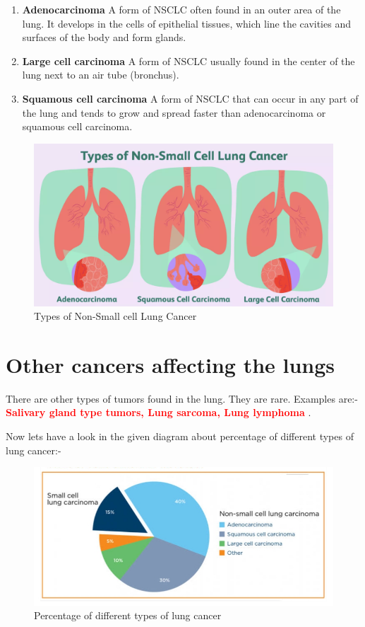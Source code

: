 \begin{enumerate}
    \item \textbf{Adenocarcinoma} A form of NSCLC often found in an outer area of the lung. It develops in the cells of epithelial tissues, which line the cavities and surfaces of the body and form glands.

    \item \textbf{Large cell carcinoma} A form of NSCLC usually found in the center of the lung next to an air tube (bronchus).

    \item \textbf{Squamous cell carcinoma} A form of NSCLC that can occur in any part of the lung and tends to grow and spread faster than adenocarcinoma or squamous cell carcinoma.
\end{enumerate}



\begin{figure}[ht!]
    \centering
    \includegraphics[width= 0.8\linewidth]{images/Non_small_cell_lung_cancer.png}
    \caption{Types of Non-Small cell Lung Cancer}
\end{figure}

\section{Other cancers affecting the lungs} 
There are other types of tumors found in the lung. They are rare. Examples are:- \textcolor{red}{\textbf{Salivary gland type tumors, Lung sarcoma, Lung lymphoma }}.
  
\vspace{3.22 mm}
Now lets have a look in the given diagram about percentage of different types of lung cancer:-

\begin{figure}[h!]
    \centering
    \includegraphics[width= 0.675\linewidth]{images/percentage_of_lc.jpeg}
    \caption{Percentage of different types of lung cancer}
    \label{fig:types-label}
\end{figure}
